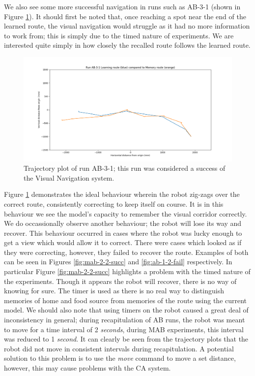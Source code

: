 \documentclass[a4paper,12pt,twoside,openright]{article}
\begin{document}
We also see some more successful navigation in runs such as AB-3-1 (shown in Figure \ref{fig:ab-3-1-succ}). It should first be
noted that, once reaching a spot near the end of the learned route, the visual navigation would struggle as it had no
more information to work from; this is simply due to the timed nature of experiments. We are interested quite simply in how
closely the recalled route follows the learned route. 

\begin{figure}
 \centering
  \includegraphics[width=\textwidth]{AB-3-1}
  \caption{
    \label{fig:ab-3-1-succ} Trajectory plot of run AB-3-1; this run was considered a success of the Visual Navigation
    system.
  }
\end{figure}

Figure \ref{fig:ab-3-1-succ} demonstrates the ideal behaviour wherein the robot zig-zags over the correct route, consistently
correcting to keep itself on course. It is in this behaviour we see the model's capacity to remember the visual corridor
correctly. We do occassionally observe another behaviour; the robot will lose its way and recover. This behaviour occurred in
cases where the robot was lucky enough to get a view which would allow it to correct. There were cases which looked as if
they were correcting, however, they failed to recover the route. Examples of both can be seen in Figures \ref{fig:mab-2-2-succ}
and \ref{fig:ab-1-2-fail} respectively. In particular Figure \ref{fig:mab-2-2-succ} highlights a problem with the timed
nature of the experiments. Though it appears the robot will recover, there is no way of knowing for sure.
The timer is used as there is no real way to distinguish memories of home and food source from memories of the route using
the current model. We should also note that using timers on the robot caused a great deal of inconsistency in general; during
recapitulation of AB runs, the robot was meant to move for a time interval of 2 \textit{seconds}, during MAB experiments, this
interval was reduced to 1 \textit{second}. It can clearly be seen from the trajectory plots that the robot did not move in
consistent intervals during recapitulation. A potential solution to this problem is to use the \textit{move} command to
move a set distance, however, this may cause problems with the CA system.
\end{document}

